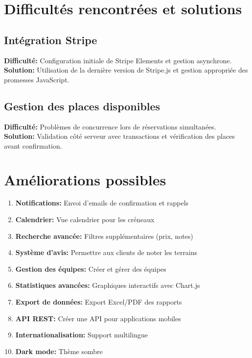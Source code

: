 \documentclass[12pt,a4paper]{article}
\begin{document}

\section{Difficultés rencontrées et solutions}

\subsection{Intégration Stripe}
\textbf{Difficulté:} Configuration initiale de Stripe Elements et gestion asynchrone.\\
\textbf{Solution:} Utilisation de la dernière version de Stripe.js et gestion appropriée des promesses JavaScript.

\subsection{Gestion des places disponibles}
\textbf{Difficulté:} Problèmes de concurrence lors de réservations simultanées.\\
\textbf{Solution:} Validation côté serveur avec transactions et vérification des places avant confirmation.


\section{Améliorations possibles}

\begin{enumerate}
    \item \textbf{Notifications:} Envoi d'emails de confirmation et rappels
    \item \textbf{Calendrier:} Vue calendrier pour les créneaux
    \item \textbf{Recherche avancée:} Filtres supplémentaires (prix, notes)
    \item \textbf{Système d'avis:} Permettre aux clients de noter les terrains
    \item \textbf{Gestion des équipes:} Créer et gérer des équipes
    \item \textbf{Statistiques avancées:} Graphiques interactifs avec Chart.js
    \item \textbf{Export de données:} Export Excel/PDF des rapports
    \item \textbf{API REST:} Créer une API pour applications mobiles
    \item \textbf{Internationalisation:} Support multilingue
    \item \textbf{Dark mode:} Thème sombre
\end{enumerate}
\end{document}
